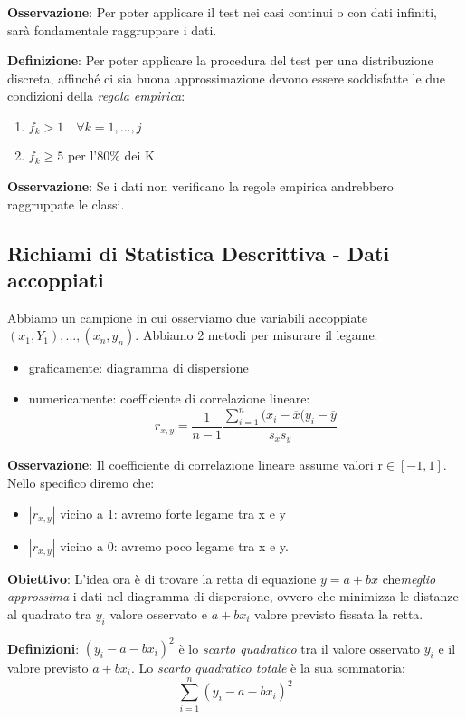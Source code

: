 \ind \textbf{Osservazione}: Per poter applicare il test nei casi continui o con dati infiniti, sarà fondamentale raggruppare i dati. \n

\ind \textbf{Definizione}: Per poter applicare la procedura del test per una distribuzione discreta, affinché ci sia buona approssimazione devono essere soddisfatte le due condizioni della \textit{regola empirica}:
\begin{enumerate}
    \item $f_k > 1 \quad \forall k = 1, ..., j$
    \item $f_k \geq 5$ per l'80\% dei K
\end{enumerate}

\ind \textbf{Osservazione}: Se i dati non verificano la regole empirica andrebbero raggruppate le classi. \n

\subsection{Richiami di Statistica Descrittiva - Dati accoppiati}

Abbiamo un campione in cui osserviamo due variabili accoppiate $(x_1, Y_1), ..., (x_n, y_n)$. Abbiamo 2 metodi per misurare il legame: 
\begin{itemize}
    \item graficamente: diagramma di dispersione
    \item numericamente: coefficiente di correlazione lineare: $$ r_{x,y} = \dfrac{1}{n-1} \dfrac{\sum_{i=1}^n (x_i - \overline{x}(y_i - \overline{y}}{s_x s_y}$$
\end{itemize}

\ind \textbf{Osservazione}: Il coefficiente di correlazione lineare assume valori r$\in [-1, 1]$. Nello specifico diremo che:
\begin{itemize}
    \item $|r_{x,y}|$ vicino a 1: avremo forte legame tra x e y
    \item $|r_{x,y}|$ vicino a 0: avremo poco legame tra x e y.
\end{itemize} 

\ind \textbf{Obiettivo}: L'idea ora è di trovare la retta di equazione $y= a + bx$ che\textit{meglio approssima} i dati nel diagramma di dispersione, ovvero che minimizza le distanze al quadrato tra $y_i$ valore osservato e $a + bx_i$ valore previsto fissata la retta. \n

\ind \textbf{Definizioni}: $(y_i - a - bx_i)^2$ è lo \textit{scarto quadratico} tra il valore osservato $y_i$ e il valore previsto $a + bx_i$. Lo \textit{scarto quadratico totale} è la sua sommatoria: $$\sum_{i=1}^n (y_i - a - bx_i)^2$$ 

